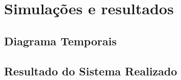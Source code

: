 \chapter{Simulações e resultados}

	\section{Diagrama Temporais}
	
	\section{Resultado do Sistema Realizado}

